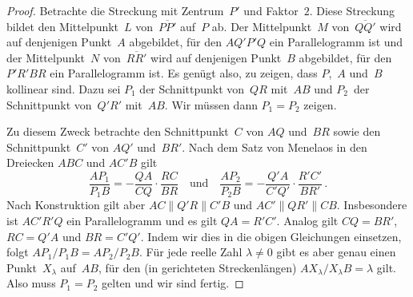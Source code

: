 \begin{proof}
	Betrachte die Streckung mit Zentrum~$P'$ und Faktor~$2$. Diese Streckung bildet den Mittelpunkt~$L$ von~$\overline{PP'}$ auf~$P$ ab. Der Mittelpunkt~$M$ von~$\overline{QQ'}$ wird auf denjenigen Punkt~$A$ abgebildet, für den $AQ'P'Q$ ein Parallelogramm ist und der Mittelpunkt~$N$ von~$\overline{RR'}$ wird auf denjenigen Punkt~$B$ abgebildet, für den $P'R'BR$ ein Parallelogramm ist.
	Es genügt also, zu zeigen, dass $P$,~$A$ und~$B$ kollinear sind. Dazu sei $P_1$ der Schnittpunkt von~$QR$ mit~$AB$ und $P_2$~der Schnittpunkt von~$Q'R'$ mit~$AB$. Wir müssen dann $P_1=P_2$ zeigen.
	
	Zu diesem Zweck betrachte den Schnittpunkt~$C$ von $AQ$ und~$BR$ sowie den Schnittpunkt~$C'$ von $AQ'$ und~$BR'$. Nach dem Satz von Menelaos in den Dreiecken $ABC$ und $AC'B$ gilt
	\begin{equation*}
		\frac{AP_1}{P_1B}=-\frac{QA}{CQ}\cdot \frac{RC}{BR}\quad \text{und}\quad \frac{AP_2}{P_2B}=-\frac{Q'A}{C'Q'}\cdot \frac{R'C'}{BR'}\,.
	\end{equation*}
	Nach Konstruktion gilt aber $AC\parallel Q'R\parallel C'B$ und $AC'\parallel QR'\parallel CB$. Insbesondere ist $AC'R'Q$ ein Parallelogramm und es gilt $QA=R'C'$. Analog gilt $CQ=BR'$, $RC=Q'A$ und $BR=C'Q'$. Indem wir dies in die obigen Gleichungen einsetzen, folgt $AP_1/P_1B=AP_2/P_2B$. Für jede reelle Zahl $\lambda\neq 0$ gibt es aber genau einen Punkt~$X_\lambda$ auf~$AB$, für den (in gerichteten Streckenlängen) $AX_\lambda/X_\lambda B=\lambda$ gilt. Also muss $P_1=P_2$ gelten und wir sind fertig.
\end{proof}
